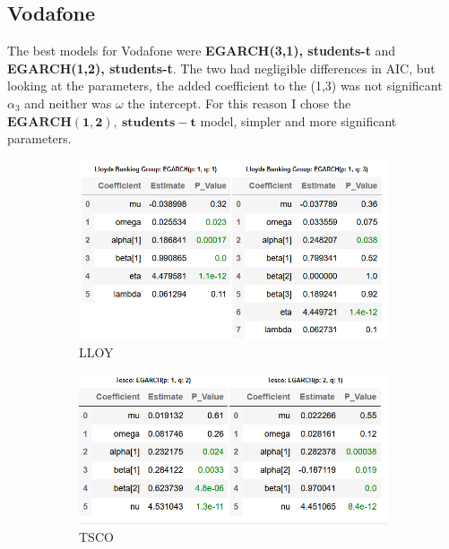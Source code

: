 \subsection{Vodafone}
The best models for Vodafone were \textbf{EGARCH(3,1), students-t} and \textbf{EGARCH(1,2), students-t}. The two had negligible differences in AIC, but looking at the parameters, the added coefficient to the (1,3) was not significant $\alpha_3$ and neither was $\omega$ the intercept. For this reason I chose the $\mathbf{EGARCH(1,2),~students-t}$ model, simpler and more significant parameters.  

\begin{figure}[hbt!]
\begin{subfigure}{.49\linewidth}
  \includegraphics[width=\linewidth]{images/parameters/Lloy.png}
  \caption{LLOY}
  \label{fig:A}
\end{subfigure} %
\begin{subfigure}{.49\linewidth}
  \includegraphics[width=\linewidth]{images/parameters/tesco.png}
  \caption{TSCO}
  \label{fig:B}
\end{subfigure}
\medskip %
\begin{subfigure}{.49\linewidth}

\end{subfigure}
\end{figure}
